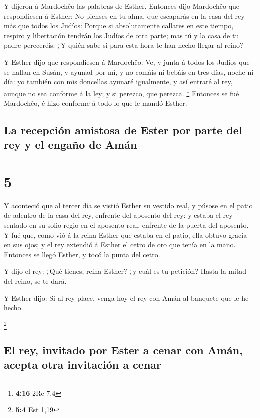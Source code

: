  Y dijeron á Mardochêo las palabras de Esther.
 Entonces dijo Mardochêo que respondiesen á Esther: No
pienses en tu alma, que escaparás en la casa del rey más que todos los
Judíos:  Porque si absolutamente callares en este tiempo,
respiro y libertación tendrán los Judíos de otra parte; mas tú y la casa
de tu padre pereceréis. ¿Y quién sabe si para esta hora te han hecho
llegar al reino?

 Y Esther dijo que respondiesen á Mardochêo:
 Ve, y junta á todos los Judíos que se hallan en Susán, y
ayunad por mí, y no comáis ni bebáis en tres días, noche ni día: yo
también con mis doncellas ayunaré igualmente, y así entraré al rey,
aunque no sea conforme á la ley; y si perezco, que perezca. \footnote{\textbf{4:16}
  2Re 7,4}  Entonces se fué Mardochêo, é hizo conforme á
todo lo que le mandó Esther.

\hypertarget{la-recepciuxf3n-amistosa-de-ester-por-parte-del-rey-y-el-engauxf1o-de-amuxe1n}{%
\subsection{La recepción amistosa de Ester por parte del rey y el engaño
de
Amán}\label{la-recepciuxf3n-amistosa-de-ester-por-parte-del-rey-y-el-engauxf1o-de-amuxe1n}}

\hypertarget{section-4}{%
\section{5}\label{section-4}}

 Y aconteció que al tercer día se vistió Esther su vestido
real, y púsose en el patio de adentro de la casa del rey, enfrente del
aposento del rey: y estaba el rey sentado en su solio regio en el
aposento real, enfrente de la puerta del aposento.  Y fué
que, como vió á la reina Esther que estaba en el patio, ella obtuvo
gracia en sus ojos; y el rey extendió á Esther el cetro de oro que tenía
en la mano. Entonces se llegó Esther, y tocó la punta del cetro.

 Y dijo el rey: ¿Qué tienes, reina Esther? ¿y cuál es tu
petición? Hasta la mitad del reino, se te dará.

 Y Esther dijo: Si al rey place, venga hoy el rey con Amán
al banquete que le he hecho.

\footnote{\textbf{5:4} Est 1,19}

\hypertarget{el-rey-invitado-por-ester-a-cenar-con-amuxe1n-acepta-otra-invitaciuxf3n-a-cenar}{%
\subsection{El rey, invitado por Ester a cenar con Amán, acepta otra
invitación a
cenar}\label{el-rey-invitado-por-ester-a-cenar-con-amuxe1n-acepta-otra-invitaciuxf3n-a-cenar}}

